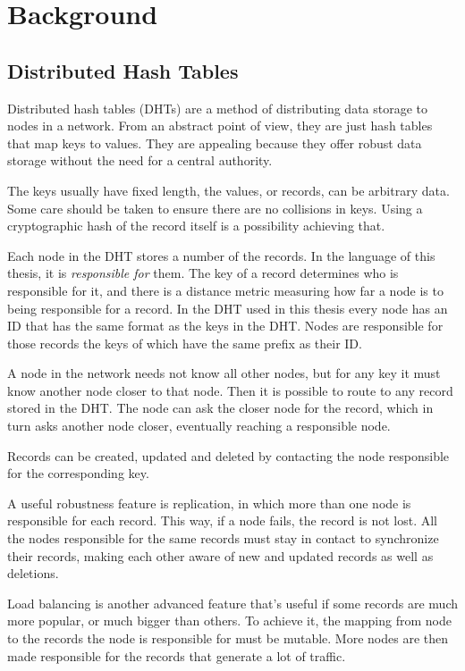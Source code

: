 \chapter{Background}
\label{chap:background}
\section{Distributed Hash Tables}
Distributed hash tables (DHTs) are a method of distributing data storage to
nodes in a network. From an abstract point of view, they are just hash tables
that map keys to values. They are appealing because they offer robust data
storage without the need for a central authority.

The keys usually have fixed length, the values, or records, can be arbitrary
data. Some care should be taken to ensure there are no collisions in keys. Using
a cryptographic hash of the record itself is a possibility achieving that.

Each node in the DHT stores a number of the records. In the language of this
thesis, it is \emph{responsible for} them. The key of a record determines who is
responsible for it, and there is a distance metric measuring how far a node is
to being responsible for a record. In the DHT used in this thesis every node has
an ID that has the same format as the keys in the DHT. Nodes are responsible for
those records the keys of which have the same prefix as their ID.

A node in the network needs not know all other nodes, but for any key it must
know another node closer to that node. Then it is possible to route to any
record stored in the DHT. The node can ask the closer node for the record, which
in turn asks another node closer, eventually reaching a responsible node.

Records can be created, updated and deleted by contacting the node responsible
for the corresponding key.

A useful robustness feature is replication, in which more than one node is
responsible for each record. This way, if a node fails, the record is not lost.
All the nodes responsible for the same records must stay in contact to
synchronize their records, making each other aware of new and updated records as
well as deletions.

Load balancing is another advanced feature that's useful if some records are
much more popular, or much bigger than others. To achieve it, the mapping from
node to the records the node is responsible for must be mutable. More nodes are
then made responsible for the records that generate a lot of traffic.

